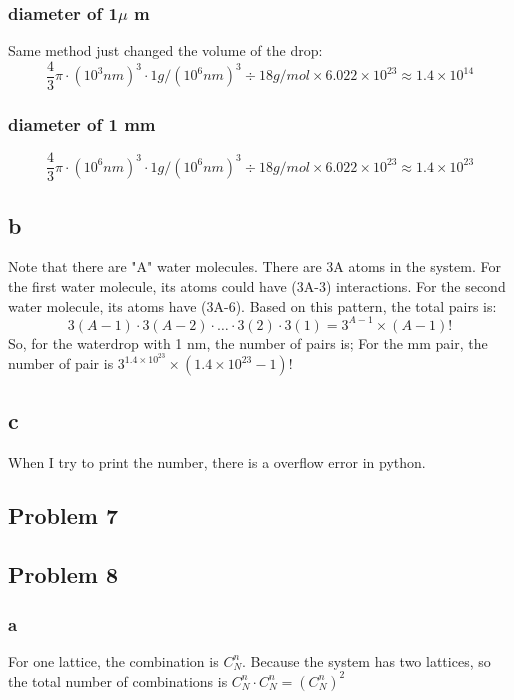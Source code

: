 \documentclass[a4paper]{article}
\begin{document}
\subsubsection{diameter of 1$\mu$ m}
Same method just changed the volume of the drop:
\begin{equation}
	\frac{4}{3}\pi \cdot (10^{3} nm)^{3} \cdot 1g/(10^{6}nm)^{3} \div 18 g/mol \times 6.022 \times 10^{23} \approx 1.4 \times 10^{14}
\end{equation}

\subsubsection{diameter of 1 mm}
\begin{equation}
	\frac{4}{3}\pi \cdot (10^{6} nm)^{3} \cdot 1g/(10^{6}nm)^{3} \div 18 g/mol \times 6.022 \times 10^{23} \approx 1.4 \times 10^{23}
\end{equation}

\subsection{b}
Note that there are "A" water molecules. There are 3A atoms in the system. For the first water molecule, its atoms could have (3A-3) interactions. For the second water molecule, its atoms have (3A-6). Based on this pattern, the total pairs is:
\begin{equation}
	3(A-1) \cdot 3(A-2) \cdot \dots \cdot 3(2) \cdot 3(1)=3^{A-1} \times (A-1)!
\end{equation}
So, for the waterdrop with 1 nm, the number of pairs is; For the mm pair, the number of pair is $3^{1.4 \times 10^{23}} \times (1.4 \times 10^{23}-1)!$

\subsection{c}
When I try to print the number, there is a overflow error in python.

\subsection{Problem 7}

\subsection{Problem 8}
\subsubsection{a}
For one lattice, the combination is $C_{N}^{n}$. Because the system has two lattices, so the total number of combinations is $C_{N}^{n} \cdot C_{N}^{n} = (C_{N}^{n})^2$
\end{document}
